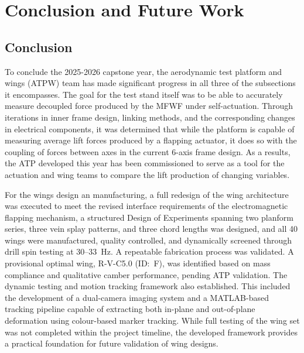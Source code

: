 \chapter{Conclusion and Future Work}
\sffamily

\section{Conclusion}
To conclude the 2025-2026 capstone year, the aerodynamic test platform and wings (ATPW) team has made significant progress in all three of the subsections it encompasses. The goal for the test stand itself was to be able to accurately measure decoupled force produced by the MFWF under self-actuation. Through iterations in inner frame design, linking methods, and the corresponding changes in electrical components, it was determined that while the platform is capable of measuring average lift forces produced by a flapping actuator, it does so with the coupling of forces between axes in the current 6-axis frame design. As a results, the ATP developed this year has been commissioned to serve as a tool for the actuation and wing teams to compare the lift production of changing variables.

For the wings design an manufacturing, a full redesign of the wing architecture was executed to meet the revised interface requirements of the electromagnetic flapping mechanism, a structured Design of Experiments spanning two planform series, three vein splay patterns, and three chord lengths was designed, and all 40 wings were manufactured, quality controlled, and dynamically screened through drill spin testing at 30--33~Hz. A repeatable fabrication process was validated. A provisional optimal wing, R-V-C5.0 (ID:~F), was identified based on mass compliance and qualitative camber performance, pending ATP validation. The dynamic testing and motion tracking framework also established. This included the development of a dual-camera imaging system and a MATLAB-based tracking pipeline capable of extracting both in-plane and out-of-plane deformation using colour-based marker tracking. While full testing of the wing set was not completed within the project timeline, the developed framework provides a practical foundation for future validation of wing designs.

